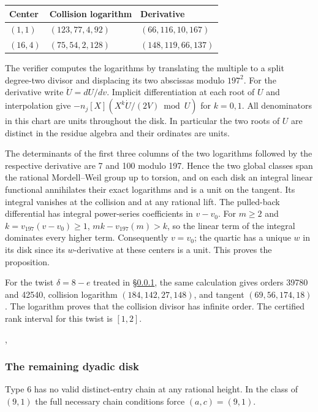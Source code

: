 {
\begin{longtable}[]{@{}lll@{}}
\toprule\noalign{}
Center & Collision logarithm & Derivative \\
\midrule\noalign{}
\endhead
\bottomrule\noalign{}
\endlastfoot
\((1,1)\) & \((123,77,4,92)\) & \((66,116,10,167)\) \\
\((16,4)\) & \((75,54,2,128)\) & \((148,119,66,137)\) \\
\end{longtable}
}

The verifier computes the logarithms by translating the multiple
to a split degree-two divisor and displacing its two abscissas modulo
\(197^2\). For the derivative write \(\dot U=dU/dv\).
Implicit differentiation at each root of \(U\) and interpolation give
\(-n_j[X](X^k\dot U/(2V)\bmod U)\) for \(k=0,1\).
All denominators in this chart are units throughout the disk. In
particular the two roots of \(U\) are distinct in the residue
algebra and their ordinates are units.

The determinants of the first three columns of the two logarithms
followed by the respective derivative are 7 and 100 modulo 197.
Hence the two global classes span the rational Mordell--Weil group
up to torsion, and on each disk an integral linear functional
annihilates their exact logarithms and is a unit on the tangent.
Its integral vanishes at the collision and at any rational lift.
The pulled-back differential has integral power-series coefficients
in \(v-v_0\). For \(m\ge2\) and \(k=v_{197}(v-v_0)\ge1\),
\(mk-v_{197}(m)>k\), so the linear term of the integral dominates
every higher term. Consequently \(v=v_0\); the quartic has a unique
\(w\) in its disk since its \(w\)-derivative at these centers is a
unit. This proves the proposition.

For the twist \(\delta=8-e\) treated in \S\ref{arith:68}, the same calculation gives
orders 39780 and 42540, collision logarithm \((184,142,27,148)\),
and tangent \((69,56,174,18)\). The logarithm proves that the
collision divisor has infinite order. The certified rank interval
for this twist is \([1,2]\).

,

\subsubsection{The remaining dyadic disk}\label{arith:68}

Type 6 has no valid distinct-entry chain at any rational
height. In the class of \((9,1)\) the full necessary chain conditions force
\((a,c)=(9,1)\).

